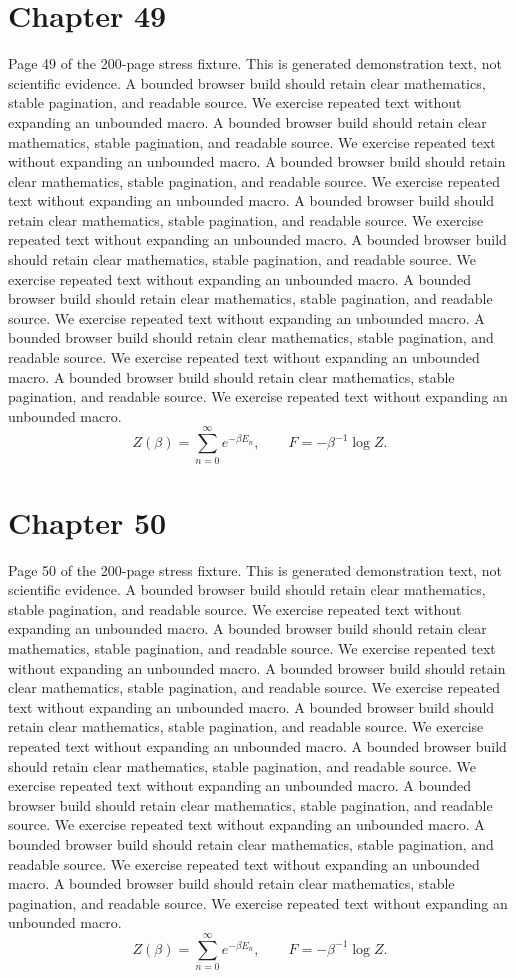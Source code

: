 \documentclass[11pt]{article}
\begin{document}
\section*{Chapter 49}
Page 49 of the 200-page stress fixture. This is generated demonstration text, not scientific evidence.
A bounded browser build should retain clear mathematics, stable pagination, and readable source. We exercise repeated text without expanding an unbounded macro.
A bounded browser build should retain clear mathematics, stable pagination, and readable source. We exercise repeated text without expanding an unbounded macro.
A bounded browser build should retain clear mathematics, stable pagination, and readable source. We exercise repeated text without expanding an unbounded macro.
A bounded browser build should retain clear mathematics, stable pagination, and readable source. We exercise repeated text without expanding an unbounded macro.
A bounded browser build should retain clear mathematics, stable pagination, and readable source. We exercise repeated text without expanding an unbounded macro.
A bounded browser build should retain clear mathematics, stable pagination, and readable source. We exercise repeated text without expanding an unbounded macro.
A bounded browser build should retain clear mathematics, stable pagination, and readable source. We exercise repeated text without expanding an unbounded macro.
A bounded browser build should retain clear mathematics, stable pagination, and readable source. We exercise repeated text without expanding an unbounded macro.
\[Z(\beta)=\sum_{n=0}^{\infty}e^{-\beta E_n},\qquad F=-\beta^{-1}\log Z.\]
\newpage
\section*{Chapter 50}
Page 50 of the 200-page stress fixture. This is generated demonstration text, not scientific evidence.
A bounded browser build should retain clear mathematics, stable pagination, and readable source. We exercise repeated text without expanding an unbounded macro.
A bounded browser build should retain clear mathematics, stable pagination, and readable source. We exercise repeated text without expanding an unbounded macro.
A bounded browser build should retain clear mathematics, stable pagination, and readable source. We exercise repeated text without expanding an unbounded macro.
A bounded browser build should retain clear mathematics, stable pagination, and readable source. We exercise repeated text without expanding an unbounded macro.
A bounded browser build should retain clear mathematics, stable pagination, and readable source. We exercise repeated text without expanding an unbounded macro.
A bounded browser build should retain clear mathematics, stable pagination, and readable source. We exercise repeated text without expanding an unbounded macro.
A bounded browser build should retain clear mathematics, stable pagination, and readable source. We exercise repeated text without expanding an unbounded macro.
A bounded browser build should retain clear mathematics, stable pagination, and readable source. We exercise repeated text without expanding an unbounded macro.
\[Z(\beta)=\sum_{n=0}^{\infty}e^{-\beta E_n},\qquad F=-\beta^{-1}\log Z.\]
\newpage
\end{document}
